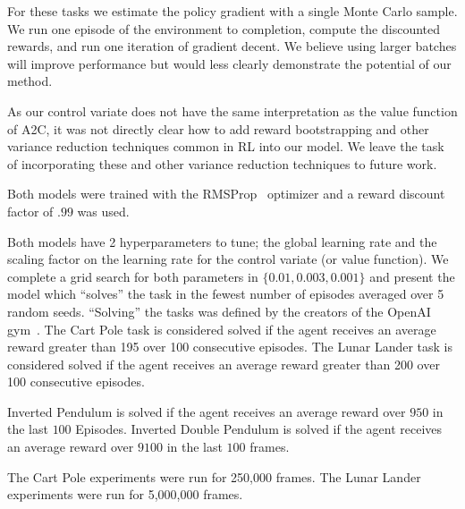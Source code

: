 \documentclass{article}
\begin{document}
For these tasks we estimate the policy gradient with a single Monte Carlo sample.
We run one episode of the environment to completion, compute the discounted rewards, and run one iteration of gradient decent.
We believe using larger batches will improve performance but would less clearly demonstrate the potential of our method. 

As our control variate does not have the same interpretation as the value function of A2C, it was not directly clear how to add reward bootstrapping and other variance reduction techniques common in RL into our model. We leave the task of incorporating these and other variance reduction techniques to future work.  

Both models were trained with the RMSProp~\citep{Tieleman2012} optimizer and a reward discount factor of $.99$ was used.

Both models have 2 hyperparameters to tune; the global learning rate and the scaling factor on the learning rate for the control variate (or value function).
We complete a grid search for both parameters in $\{0.01, 0.003, 0.001\}$ and present the model which ``solves'' the task in the fewest number of episodes averaged over 5 random seeds.
``Solving'' the tasks was defined by the creators of the OpenAI gym~\citep{1606.01540}.
The Cart Pole task is considered solved if the agent receives an average reward greater than 195 over 100 consecutive episodes.
The Lunar Lander task is considered solved if the agent receives an average reward greater than 200 over 100 consecutive episodes. 

Inverted Pendulum is solved if the agent receives an average reward over $950$ in the last $100$ Episodes.
Inverted Double Pendulum is solved if the agent receives an average reward over $9100$ in the last $100$ frames.

The Cart Pole experiments were run for 250,000 frames.
The Lunar Lander experiments were run for 5,000,000 frames. 
\end{document}
